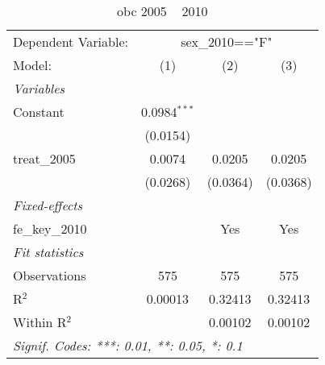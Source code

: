 
\begin{table}[htbp]
   \caption{obc 2005 ~ 2010}
   \centering
   \begin{tabular}{lccc}
      \tabularnewline \midrule \midrule
      Dependent Variable: & \multicolumn{3}{c}{sex\_2010=="F"}\\
      Model:          & (1)            & (2)      & (3)\\  
      \midrule
      \emph{Variables}\\
      Constant        & 0.0984$^{***}$ &          &   \\   
                      & (0.0154)       &          &   \\   
      treat\_2005     & 0.0074         & 0.0205   & 0.0205\\   
                      & (0.0268)       & (0.0364) & (0.0368)\\   
      \midrule
      \emph{Fixed-effects}\\
      fe\_key\_2010   &                & Yes      & Yes\\  
      \midrule
      \emph{Fit statistics}\\
      Observations    & 575            & 575      & 575\\  
      R$^2$           & 0.00013        & 0.32413  & 0.32413\\  
      Within R$^2$    &                & 0.00102  & 0.00102\\  
      \midrule \midrule
      \multicolumn{4}{l}{\emph{Signif. Codes: ***: 0.01, **: 0.05, *: 0.1}}\\
   \end{tabular}
\end{table}



